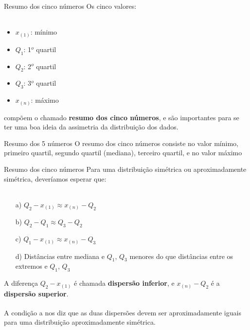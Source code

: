 \documentclass[10pt]{beamer}\usepackage[]{graphicx}\usepackage[]{color}
\theoremstyle{definition}
\begin{document}
\begin{frame}{Resumo dos cinco números}
  Os cinco valores: \\~\\
  \begin{itemize}
  \item $x_{(1)}$: mínimo
  \item $Q_1$: 1$^o$ quartil
  \item $Q_2$: 2$^o$ quartil
  \item $Q_3$: 3$^o$ quartil
  \item $x_{(n)}$: máximo
  \end{itemize}
  \vspace{1em}
  compõem o chamado \textbf{resumo dos cinco números}, e são importantes
  para se ter uma boa ideia da assimetria da distribuição dos dados.
    \begin{block}{Resumo dos 5 números}
    O resumo dos cinco números consiste no valor mínimo, primeiro
    quartil, segundo quartil (mediana), terceiro quartil, e no valor
    máximo
  \end{block}
\end{frame}

\begin{frame}{Resumo dos cinco números}
  Para uma distribuição simétrica ou aproximadamente simétrica,
  deveríamos esperar que: \\~\\
  \begin{itemize}
  \item[a)] $Q_2 - x_{(1)} \approx x_{(n)} - Q_2$
  \item[b)] $Q_2 - Q_1 \approx Q_3 - Q_2$
  \item[c)] $Q_1 - x_{(1)} \approx x_{(n)} - Q_3$
  \item[d)] Distâncias entre mediana e $Q_1$, $Q_3$ menores do que
    distâncias entre os extremos e $Q_1$, $Q_3$
  \end{itemize}
  \vspace{1em}
  A diferença $Q_2 - x_{(1)}$ é chamada \textbf{dispersão inferior}, e
  $x_{(n)} - Q_2$ é a \textbf{dispersão superior}. \\~\\
  A condição a nos diz que as duas dispersões devem ser aproximadamente
  iguais para uma distribuição aproximadamente simétrica.
\end{frame}
\end{document}
